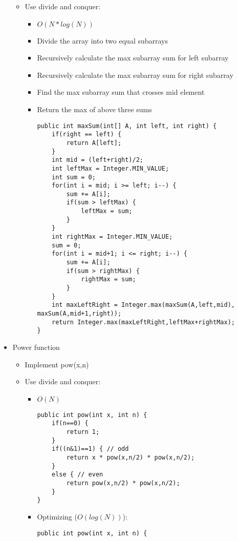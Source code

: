 \documentclass[a4paper, 11.25pt]{article}
\begin{document}
\begin{itemize}
\begin{itemize}
        \item Use divide and conquer:
        \begin{itemize}
            \item $O(N*log(N))$
            \item Divide the array into two equal subarrays
            \item Recursively calculate the max subarray sum for left subarray
            \item Recursively calculate the max subarray sum for right subarray
            \item Find the max subarray sum that crosses mid element
            \item Return the max of above three sums
            \begin{lstlisting}[style=CStyle]
public int maxSum(int[] A, int left, int right) {
    if(right == left) {
        return A[left];
    }
    int mid = (left+right)/2;
    int leftMax = Integer.MIN_VALUE;
    int sum = 0;
    for(int i = mid; i >= left; i--) {
        sum += A[i];
        if(sum > leftMax) {
            leftMax = sum;
        }
    }
    int rightMax = Integer.MIN_VALUE;
    sum = 0;
    for(int i = mid+1; i <= right; i--) {
        sum += A[i];
        if(sum > rightMax) {
            rightMax = sum;
        }
    }
    int maxLeftRight = Integer.max(maxSum(A,left,mid), maxSum(A,mid+1,right));
    return Integer.max(maxLeftRight,leftMax+rightMax);
}\end{lstlisting} 
        \end{itemize}
    \end{itemize}
    \item Power function
    \begin{itemize}
        \item Implement pow(x,n)
        \item Use divide and conquer:
        \begin{itemize}
            \item $O(N)$
            \begin{lstlisting}[style=CStyle]
public int pow(int x, int n) {
    if(n==0) {
        return 1;
    }
    if((n&1)==1) { // odd
        return x * pow(x,n/2) * pow(x,n/2);
    }
    else { // even
        return pow(x,n/2) * pow(x,n/2);
    }
}\end{lstlisting} 
            \item Optimizing ($O(log(N))$):
            \begin{lstlisting}[style=CStyle]
public int pow(int x, int n) {

\end{lstlisting}
\end{itemize}
\end{itemize}
\end{itemize}
\end{document}
